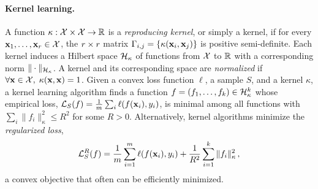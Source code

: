 \paragraph{Kernel learning.} A function $\kappa:{\cal X}\times {\cal X}\to {\mathbb R}$ is
a {\em reproducing kernel}, or simply a kernel, if for every
${\mathbf x}_1,\ldots,{\mathbf x}_r\in{\cal X}$, the $r \times r$ matrix $\Gamma_{i,j} = \{\kappa({\mathbf x}_i,{\mathbf x}_j)\}$
is positive semi-definite. Each kernel induces a Hilbert space
${\cal H}_{\kappa}$ of functions from ${\cal X}$ to ${\mathbb R}$ with a corresponding norm
$\|\cdot\|_{{\cal H}_\kappa}$. A kernel and its corresponding space are {\em
normalized} if $\forall {\mathbf x}\in{\cal X},\;\kappa({\mathbf x},{\mathbf x})=1$. Given a convex loss
function $\ell$, %
a sample $S$, and a kernel
$\kappa$, a kernel learning algorithm finds a function
$f=(f_1,\ldots,f_k)\in{\cal H}^k_{\kappa}$ whose empirical loss,
${\cal L}_S(f)=\frac{1}{m}\sum_i \ell(f({\mathbf x}_i),y_i)$, is minimal among all
functions with $\sum_{i}\|f_i\|_\kappa^2 \le R^2$ for some $R>0$.
Alternatively, kernel algorithms minimize the {\em regularized loss},
$${\cal L}^R_S(f)=\frac{1}{m}\sum_{i=1}^m \ell(f({\mathbf x}_i),y_i) +
\frac{1}{R^2}\sum_{i=1}^k\|f_i\|^2_{\kappa} \,, $$
a convex objective that often can be efficiently minimized.
